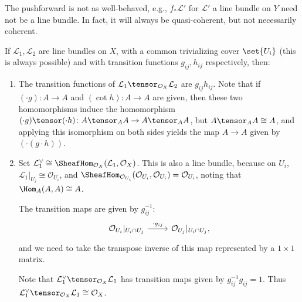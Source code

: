 The pushforward is not as well-behaved, e.g., $f_*\mathcal{L}'$ for $\mathcal{L}'$ a line
bundle on $Y$ need not be a line bundle. In fact, it will always be quasi-coherent, but not
necessarily coherent.

If $\mathcal{L}_1, \mathcal{L}_2$ are line bundles on $X$, with a common trivializing
cover $\set{U_i}$ (this is always possible) and with transition functions
$g_{ij}, h_{ij}$ respectively, then:
\begin{enumerate}
	\item The transition functions of $\mathcal{L}_1\tensor_{\mathcal{O}_X} \mathcal{L}_2$
		are $g_{ij}h_{ij}$. Note that if $(\cdot g)\colon A\to A$ and  $(\cot h)\colon A\to A$
		are given, then these two homomorphisms induce the homomorphism
		$(\cdot g)\tensor (\cdot h)\colon A\tensor_A A\to A\tensor_A A$, but
		$A\tensor_A A\cong A$, and applying this isomorphism on both sides yields
		the map $A\to A$ given by $(\cdot (g\cdot h))$.
	\item Set $\mathcal{L}_1^\vee\cong \SheafHom_{\mathcal{O}_X}(\mathcal{L}_1, \mathcal{O}_X)$.
		This is also a line bundle, because on $U_i$, $\mathcal{L}_1|_{U_i}\cong \mathcal{O}_{U_i}$,
		and $\SheafHom_{\mathcal{O}_{U_i}}(\mathcal{O}_{U_i}, \mathcal{O}_{U_i}) = \mathcal{O}_{U_i}$,
		noting that $\Hom_A(A, A)\cong A$.

		The transition maps are given by $g_{ij}^{-1}$:
		\[\begin{tikzcd}
			\mathcal{O}_{U_i}|_{U_i\cap U_j}\ar[r, "\cdot g_{ij}"] & \mathcal{O}_{U_j}|_{U_i\cap U_j},
		\end{tikzcd}\]
		and we need to take the transpose inverse of this map represented by a
		$1\times 1$ matrix.

		Note that $\mathcal{L}_1^\vee\tensor_{\mathcal{O}_X}\mathcal{L}_1$ has transition
		maps given by $g_{ij}^{-1}g_{ij} = 1$. Thus $\mathcal{L}_1^\vee \tensor_{\mathcal{O}_X} \mathcal{L}_1\cong \mathcal{O}_X$.
\end{enumerate}
